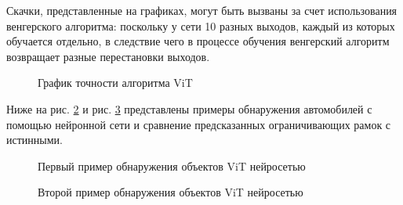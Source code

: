 \documentclass[14pt,a4paper]{extarticle}
\begin{document}
Скачки, представленные на графиках, могут быть вызваны за счет использования венгерского алгоритма: поскольку у сети 10 разных выходов, каждый из которых обучается отдельно, в следствие чего в процессе обучения венгерский алгоритм возвращает разные перестановки выходов.

\begin{figure}[h!]
\caption{График точности алгоритма ViT}
\label{Acc}
\end{figure} 

Ниже на рис. \ref{result1} и рис. \ref{result4} представлены примеры обнаружения автомобилей с помощью нейронной сети и сравнение предсказанных ограничивающих рамок с истинными.

\newpage
\begin{figure}[h!]
\caption{Первый пример обнаружения объектов ViT нейросетью}
\label{result1}
\end{figure} 

\begin{figure}[h!]
\caption{Второй пример обнаружения объектов ViT нейросетью}
\label{result4}
\end{figure} 
\end{document}
